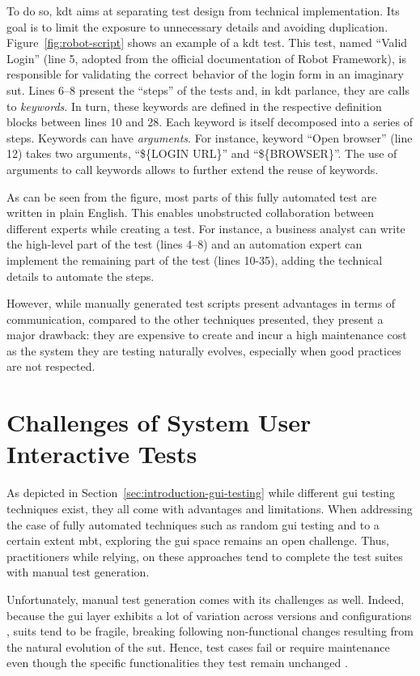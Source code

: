To do so, \gls{kdt} \cite{Tang2008, Hametner2012} aims at separating test design from technical implementation. Its goal is to limit the exposure to unnecessary details and avoiding duplication. Figure~\ref{fig:robot-script} shows an example of a \gls{kdt} test. This test, named ``Valid Login'' (line 5, adopted from the official documentation of Robot Framework), is responsible for validating the correct behavior of the login form in an imaginary \gls{sut}. Lines 6--8 present the ``steps'' of the tests and, in \gls{kdt} parlance, they are calls to \emph{keywords}. In turn, these keywords are defined in the respective definition blocks between lines 10 and 28. Each keyword is itself decomposed into a series of steps. Keywords can have \emph{arguments}. For instance, keyword ``Open browser'' (line 12) takes two arguments, ``\$\{LOGIN URL\}'' and ``\$\{BROWSER\}''. The use of arguments to call keywords allows to further extend the reuse of keywords.

As can be seen from the figure, most parts of this fully automated test are written in plain English. This enables unobstructed collaboration between different experts while creating a test. For instance, a business analyst can write the high-level part of the test (lines 4--8) and an automation expert can implement the remaining part of the test (lines 10-35), adding the technical details to automate the steps.

However, while manually generated test scripts present advantages in terms of communication, compared to the other techniques presented, they present a major drawback: they are expensive to create and incur a high maintenance cost as the system they are testing naturally evolves, especially when good practices are not respected.

\section{Challenges of System User Interactive Tests}

As depicted in Section~\ref{sec:introduction-gui-testing} while different \gls{gui} testing techniques exist, they all come with advantages and limitations. When addressing the case of fully automated techniques such as random \gls{gui} testing and to a certain extent \gls{mbt}, exploring the \gls{gui} space remains an open challenge. Thus, practitioners while relying, on these approaches tend to complete the test suites with manual test generation.

Unfortunately, manual test generation comes with its challenges as well. Indeed, because the \gls{gui} layer exhibits a lot of variation across versions and configurations \cite{Gao2015}, \gls{suit}s  tend to be fragile, \ie breaking following non-functional changes resulting from the natural evolution of the \gls{sut}. Hence, test cases fail or require maintenance even though the specific functionalities they test remain unchanged \cite{Coppola2019, DiMartino2021}.

